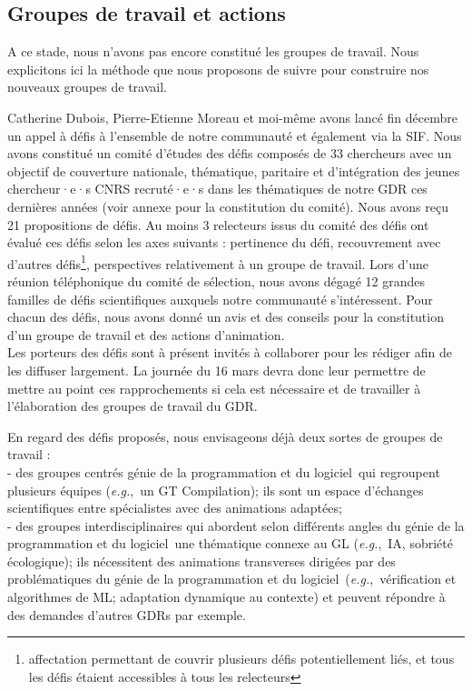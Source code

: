 \documentclass[11pt]{article}
\newcommand{\gpl}[0]{génie de la programmation et du logiciel}
\newcommand{\eg}[0]{\emph{e.g.},~}
\begin{document}
\subsection{Groupes de travail et actions}
A ce stade, nous n'avons pas encore constitué les groupes de travail.
Nous explicitons ici la méthode que nous proposons de suivre pour construire nos nouveaux groupes de travail.

Catherine Dubois, Pierre-Etienne Moreau et moi-même avons lancé fin décembre un appel à défis à l'ensemble de notre communauté et également via la SIF. 
Nous avons constitué un  comité d'études des défis composés de 33 chercheurs avec un objectif de couverture nationale, thématique, paritaire et d'intégration des jeunes chercheur·e·s CNRS recruté·e·s dans les thématiques de notre GDR ces dernières années (voir annexe pour la constitution du comité). 
Nous avons reçu 21 propositions de défis.
Au moins 3 relecteurs issus du comité des défis ont évalué ces défis selon les axes suivants : pertinence du défi, recouvrement avec d'autres défis\footnote{affectation permettant de couvrir plusieurs défis potentiellement liés, et tous les défis étaient accessibles à tous les relecteurs}, perspectives relativement à un groupe de travail. Lors d'une réunion téléphonique du comité de sélection, nous avons dégagé 12 grandes familles de défis scientifiques auxquels notre communauté s'intéressent. Pour chacun des défis, nous avons donné un avis et des conseils pour la constitution d'un groupe de travail et des actions d'animation.\\
Les porteurs des défis sont à présent invités à collaborer pour les rédiger afin de les diffuser largement. La journée du 16 mars devra donc leur permettre de mettre au point ces rapprochements si cela est nécessaire et de travailler à l'élaboration des groupes de travail du GDR.

En regard des défis proposés, nous envisageons déjà deux sortes de groupes de travail : \\
- des groupes centrés \gpl~qui regroupent plusieurs équipes (\eg un GT Compilation); ils sont un espace d'échanges scientifiques entre spécialistes avec des animations adaptées; \\
- des groupes interdisciplinaires qui abordent selon différents angles du \gpl~une thématique connexe au GL (\eg IA, sobriété écologique); ils nécessitent des animations transverses dirigées par des problématiques du \gpl~(\eg vérification et algorithmes de ML; adaptation dynamique au contexte) et peuvent répondre à des demandes d'autres GDRs par exemple.
\end{document}
